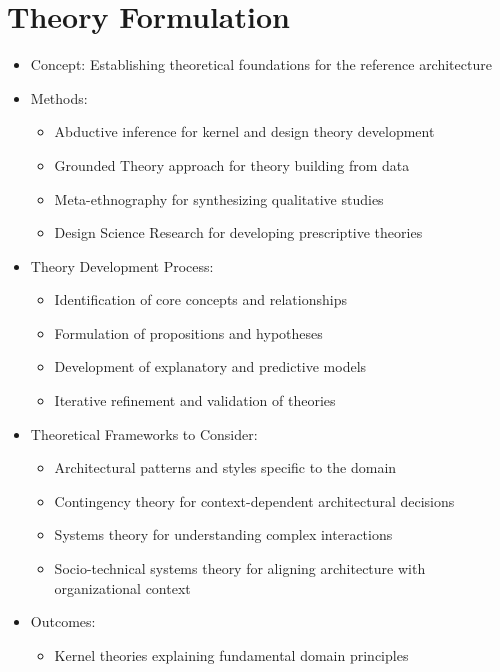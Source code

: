 \documentclass[12pt,a4paper]{article}
\begin{document}
\section{Theory Formulation}
\begin{itemize}
    \item Concept: Establishing theoretical foundations for the reference architecture
    \item Methods:
    \begin{itemize}
        \item Abductive inference for kernel and design theory development \citep{Dubois2014}
        \item Grounded Theory approach for theory building from data \citep{Glaser1967}
        \item Meta-ethnography for synthesizing qualitative studies \citep{Noblit1988}
        \item Design Science Research for developing prescriptive theories \citep{Gregor2013}
    \end{itemize}
    \item Theory Development Process:
    \begin{itemize}
        \item Identification of core concepts and relationships
        \item Formulation of propositions and hypotheses
        \item Development of explanatory and predictive models
        \item Iterative refinement and validation of theories
    \end{itemize}
    \item Theoretical Frameworks to Consider:
    \begin{itemize}
        \item Architectural patterns and styles specific to the domain \citep{Nakagawa2023}
        \item Contingency theory for context-dependent architectural decisions \citep{Kallinikos2006}
        \item Systems theory for understanding complex interactions \citep{Bertalanffy1968}
        \item Socio-technical systems theory for aligning architecture with organizational context \citep{Baxter2011}
    \end{itemize}
    \item Outcomes:
    \begin{itemize}
        \item Kernel theories explaining fundamental domain principles

\end{itemize}
\end{itemize}
\end{document}
